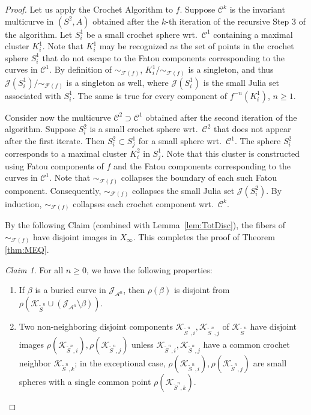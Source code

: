 \documentclass{amsart}
\theoremstyle{plain}
\theoremstyle{definition}
\theoremstyle{remark}
\newtheorem*{claim}{Claim}
\renewcommand{\AA}{{\mathcal A}}
\newcommand{\filled}{{\mathcal K}}
\newcommand{\reminder}[1]{\textsl{$\lhd\rhd$#1$\lhd\rhd$}\marginpar{$\lhd\rhd\lhd\rhd\lhd\rhd$}}%
\newcommand{\hide}[1]{}
\newcommand{\Fat}{{\mathcal F}}
\newcommand{\Jul}{{\mathcal J}}
\newcommand{\CC}{{\mathcal C}}
\begin{document}
\begin{proof}
Let us apply the Crochet Algorithm to $f$.  Suppose $\CC^k$ is the invariant multicurve in $(S^2, A)$ obtained after the $k$-th iteration of the recursive Step 3 of the algorithm. Let $S^1_i$ be a small crochet sphere wrt.\  $\CC^1$ containing a maximal cluster $K^1_i$. Note that $K^1_i$ may be recognized as the set of points in the crochet sphere $S^1_i$ that do not escape to the Fatou components corresponding to the curves in $\CC^1$.  By definition of $\sim_{\Fat(f)}$,  $K^1_i/\sim_{\Fat(f)}$
is a singleton, and thus $\Jul(S^1_i)/\sim_{\Fat(f)}$ is a singleton as well, where $\Jul(S^1_i)$ is the small Julia set associated with $S^1_i$.
The same is true for every component of $f^{-n}(K^1_i)$, $n\geq 1$.  




Consider now the multicurve $\CC^2\supset \CC^1$ obtained after the second iteration of the algorithm.  Suppose $S^2_i$ is a small crochet sphere wrt.\ $\CC^2$ that does not appear after the first iterate.   Then $S^2_i \subset S^1_j$ for a small sphere wrt.\ $\CC^1$.  The sphere $S^2_i$ corresponds to a maximal cluster $K^2_i$ in $S^1_j$. Note that this cluster is constructed using Fatou components of $f$ and the Fatou components corresponding to the curves in $\CC^1$.  Note that $\sim_{\Fat(f)}$ collapses the boundary of each such Fatou component.  Consequently,  $\sim_{\Fat(f)}$ collapses the small Julia set $\Jul(S^2_i)$.  By induction,  $\sim_{\Fat(f)}$ collapses each crochet component wrt.\ $\CC^k$.


By the following Claim (combined with Lemma~\ref{lem:TotDisc}), the fibers of  $\sim_{\Fat(f)}$  have disjoint images in $X_\infty$. This completes the proof of Theorem \ref{thm:MEQ}.




\begin{claim}
For all $n\ge 0$, we have the following properties:
\begin{enumerate}[label=\text{(\arabic*)},font=\normalfont,leftmargin=*]
\item\label{main proof:cond:1} If $\beta$ is a buried curve in $\Jul_{\AA^n}$, then $\rho(\beta)$ is disjoint from $\rho (\filled_{\widetilde S^n}\cup (\Jul_{\AA^n}\setminus \beta))$.
\item\label{main proof:cond:2} Two non-neighboring disjoint components $\filled_{\widetilde S^n, i},\filled_{\widetilde S^n, j}$ of $\filled_{\widetilde S^n}$ have disjoint images $\rho(\filled_{\widetilde S^n, i}),\rho(\filled_{\widetilde S^n, j})$ unless $\filled_{\widetilde S^n, i},\filled_{\widetilde S^n, j}$ have a common crochet neighbor $\filled_{\widetilde S^n,k}$; in the exceptional case, $\rho(\filled_{\widetilde S^n, i}),\rho(\filled_{\widetilde S^n, j})$ are small spheres with a single common point  $\rho(\filled_{\widetilde S^n,k})$.


\end{enumerate}
\end{claim}
\end{proof}
\end{document}
